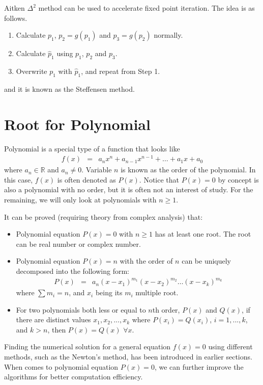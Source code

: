 Aitken $\Delta^2$ method can be used to accelerate fixed point iteration. The idea is as follows.
\begin{enumerate}
  \item Calculate $p_1$, $p_2=g(p_1)$ and $p_3=g(p_2)$ normally.
  \item Calculate $\hat{p}_1$ using $p_1$, $p_2$ and $p_3$.
  \item Overwrite $p_1$ with $\hat{p}_1$, and repeat from Step 1.
\end{enumerate}
and it is known as the Steffensen method.

\section{Root for Polynomial}

Polynomial is a special type of a function that looks like
\begin{eqnarray}
  f(x) &=& a_nx^n + a_{n-1}x^{n-1} + \ldots + a_1x + a_0 \nonumber
\end{eqnarray}
where $a_n \in \mathbb{R}$ and $a_n\neq 0$. Variable $n$ is known as the order of the polynomial. In this case, $f(x)$ is often denoted as $P(x)$. Notice that $P(x)=0$ by concept is also a polynomial with no order, but it is often not an interest of study. For the remaining, we will only look at polynomials with $n\geq 1$. 

It can be proved (requiring theory from complex analysis) that:
\begin{itemize}
  \item Polynomial equation $P(x)=0$ with $n\geq 1$ has at least one root. The root can be real number or complex number.
  \item Polynomial equation $P(x)=n$ with the order of $n$ can be uniquely decomposed into the following form:
  \begin{eqnarray}
  P(x) &=& a_n(x-x_1)^{m_1}(x-x_2)^{m_2}\ldots(x-x_k)^{m_k} \nonumber
\end{eqnarray}
where $\sum m_i = n$, and $x_i$ being its $m_i$ multiple root.
  \item For two polynomials both less or equal to $n$th order, $P(x)$ and $Q(x)$, if there are distinct values $x_1, x_2, ..., x_k$ where $P(x_i)=Q(x_i)$, $i = 1,...,k$, and $k>n$, then $P(x)=Q(x)$ $\forall x$.
\end{itemize}

Finding the numerical solution for a general equation $f(x)=0$ using different methods, such as the Newton's method, has been introduced in earlier sections. When comes to polynomial equation $P(x)=0$, we can further improve the algorithms for better computation efficiency.

